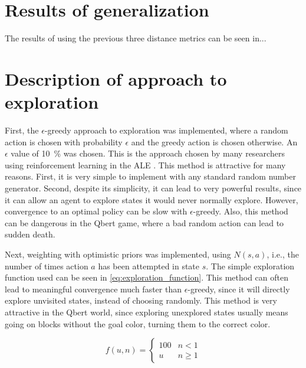\documentclass[a4paper,titlepage]{article}
\begin{document}
	\section{Results of generalization}
	
	The results of using the previous three distance metrics can be seen in...
	
	\section{Description of approach to exploration}
	
	First, the $\epsilon$-greedy approach to exploration was implemented, where a random action is chosen with probability $\epsilon$ and the greedy action is chosen otherwise. An $\epsilon$ value of \SI{10}{\percent} was chosen. This is the approach chosen by many researchers using reinforcement learning in the ALE \cite{defazio,bellemare,mnih}. This method is attractive for many reasons. First, it is very simple to implement with any standard random number generator. Second, despite its simplicity, it can lead to very powerful results, since it can allow an agent to explore states it would never normally explore. However, convergence to an optimal policy can be slow with $\epsilon$-greedy. Also, this method can be dangerous in the Qbert game, where a bad random action can lead to sudden death.
	
	
	Next, weighting with optimistic priors was implemented, using $N(s, a)$, i.e., the number of times action $a$ has been attempted in state $s$. The simple exploration function used can be seen in \cref{eq:exploration_function}. This method can often lead to meaningful convergence much faster than $\epsilon$-greedy, since it will directly explore unvisited states, instead of choosing randomly. This method is very attractive in the Qbert world, since exploring unexplored states usually means going on blocks without the goal color, turning them to the correct color.
	
	\begin{equation} \label{eq:exploration_function}
		f(u, n) =
		\begin{cases}
			100 & n < 1 \\
			u & n \geq 1
		\end{cases}
	\end{equation}
	
\end{document}
